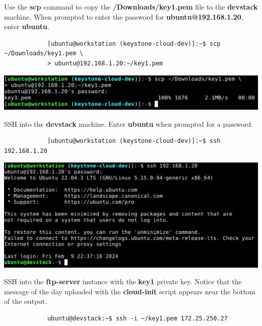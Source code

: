 \documentclass[letterpaper, 12pt]{article}
\begin{document}
\begin{enumerate}
    \begin{labstep}
        Use the \textbf{scp} command to copy the \textbf{\texttildemid/Downloads/key1.pem} file to the \textbf{devstack} machine.
        When prompted to enter the password for \textbf{ubuntu@192.168.1.20}, enter
        \textbf{ubuntu}.
        \begin{lstlisting}
            [ubuntu@workstation (keystone-cloud-dev)]:~$ scp ~/Downloads/key1.pem \
            > ubuntu@192.168.1.20:~/key1.pem
        \end{lstlisting}

        \begin{center}
            \includegraphics[width=\linewidth]{images/part2/step5.png}
        \end{center}
    \end{labstep}

    \begin{labstep}
        SSH into the \textbf{devstack} machine.
        Enter \textbf{ubuntu} when prompted for a password.
        \begin{lstlisting}
            [ubuntu@workstation (keystone-cloud-dev)]:~$ ssh 192.168.1.20
        \end{lstlisting}

        \begin{center}
            \includegraphics[width=\linewidth]{images/part2/step6.png}
        \end{center}
    \end{labstep}

    \begin{labstep}
        SSH into the \textbf{ftp-server} instance with the \textbf{key1} private key.
        Notice that the message of the day uploaded with the \textbf{cloud-init} script appears near the bottom of the output.
        \begin{lstlisting}
            ubuntu@devstack:~$ ssh -i ~/key1.pem 172.25.250.27
        \end{lstlisting}


\end{labstep}
\end{enumerate}
\end{document}
